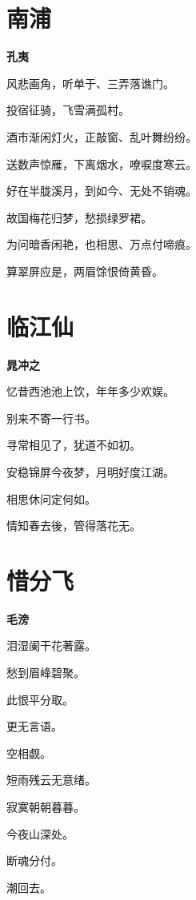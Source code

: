 \documentclass[12pt,a4paper]{ctexbook}
\begin{document}
\section{南浦}
\textbf{孔夷}\par\vspace{0.5em}
风悲画角，听单于、三弄落谯门。\par
投宿征骑，飞雪满孤村。\par
酒市渐闲灯火，正敲窗、乱叶舞纷纷。\par
送数声惊雁，下离烟水，嘹唳度寒云。\par
好在半胧溪月，到如今、无处不销魂。\par
故国梅花归梦，愁损绿罗裙。\par
为问暗香闲艳，也相思、万点付啼痕。\par
算翠屏应是，两眉馀恨倚黄昏。\par

\section{临江仙}
\textbf{晁冲之}\par\vspace{0.5em}
忆昔西池池上饮，年年多少欢娱。\par
别来不寄一行书。\par
寻常相见了，犹道不如初。\par
安稳锦屏今夜梦，月明好度江湖。\par
相思休问定何如。\par
情知春去後，管得落花无。\par

\section{惜分飞}
\textbf{毛滂}\par\vspace{0.5em}
泪湿阑干花著露。\par
愁到眉峰碧聚。\par
此恨平分取。\par
更无言语。\par
空相觑。\par
短雨残云无意绪。\par
寂寞朝朝暮暮。\par
今夜山深处。\par
断魂分付。\par
潮回去。\par
\end{document}

